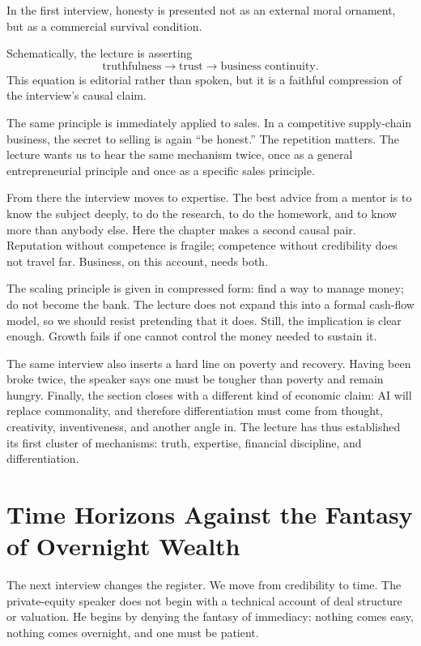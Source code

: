 \begin{proposition}
In the first interview, honesty is presented not as an external moral ornament, but as a commercial survival condition.
\end{proposition}

Schematically, the lecture is asserting
\begin{equation}
\text{truthfulness} \longrightarrow \text{trust} \longrightarrow \text{business continuity}.
\end{equation}
This equation is editorial rather than spoken, but it is a faithful compression of the interview's causal claim.

The same principle is immediately applied to sales. In a competitive supply-chain business, the secret to selling is again ``be honest.'' The repetition matters. The lecture wants us to hear the same mechanism twice, once as a general entrepreneurial principle and once as a specific sales principle.

From there the interview moves to expertise. The best advice from a mentor is to know the subject deeply, to do the research, to do the homework, and to know more than anybody else. Here the chapter makes a second causal pair. Reputation without competence is fragile; competence without credibility does not travel far. Business, on this account, needs both.

The scaling principle is given in compressed form: find a way to manage money; do not become the bank. The lecture does not expand this into a formal cash-flow model, so we should resist pretending that it does. Still, the implication is clear enough. Growth fails if one cannot control the money needed to sustain it.

The same interview also inserts a hard line on poverty and recovery. Having been broke twice, the speaker says one must be tougher than poverty and remain hungry. Finally, the section closes with a different kind of economic claim: AI will replace commonality, and therefore differentiation must come from thought, creativity, inventiveness, and another angle in. The lecture has thus established its first cluster of mechanisms: truth, expertise, financial discipline, and differentiation.

\section{Time Horizons Against the Fantasy of Overnight Wealth}

The next interview changes the register. We move from credibility to time. The private-equity speaker does not begin with a technical account of deal structure or valuation. He begins by denying the fantasy of immediacy: nothing comes easy, nothing comes overnight, and one must be patient.

